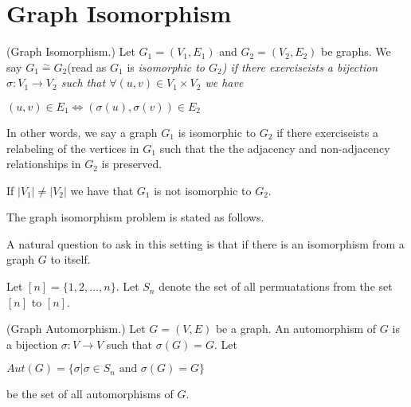 
\section{Graph Isomorphism}


\begin{definition}(Graph Isomorphism.)
Let $G_1=(V_1,E_1)$ and $G_2=(V_2,E_2)$ be graphs. We say $G_1\stackrel{\sim}{=}G_2$(read as $G_1$ is \em isomorphic to $G_2$) if there exerciseists a bijection $\sigma : V_1\rightarrow V_2$ such that $\forall (u,v) \in V_1\times V_2$ we have
\begin{center}
$(u,v)\in E_1 \iff (\sigma(u),\sigma(v))\in E_2$
\end{center}
\end{definition}

In other words, we say a graph $G_1$ is isomorphic to $G_2$ if there exerciseists a relabeling of the vertices in $G_1$  such that the the adjacency and non-adjacency relationships in $G_2$ is preserved. 
\begin{observation}
If $|V_1|\neq |V_2|$ we have that $G_1$ is not isomorphic to $G_2$.
\end{observation}

The graph isomorphism problem is stated as follows. 
\begin{center}
\end{center}

A natural question to ask in this setting is that if there is an isomorphism from a graph $G$ to itself. 

Let $[n]=\{1,2,\ldots,n\}$. Let $S_n$ denote the set of all permuatations from the set $[n]$ to $[n]$.

\begin{definition}(Graph Automorphism.) 
Let $G=(V,E)$ be a graph. An automorphism of $G$ is a bijection $\sigma:V\rightarrow V$ such that $\sigma(G)= G$. Let
\begin{center}
$Aut(G)= \{\sigma | \sigma\in S_n \text{~and~} \sigma(G)= G \}$
\end{center}
be the set of all automorphisms of $G$. 
\end{definition}



